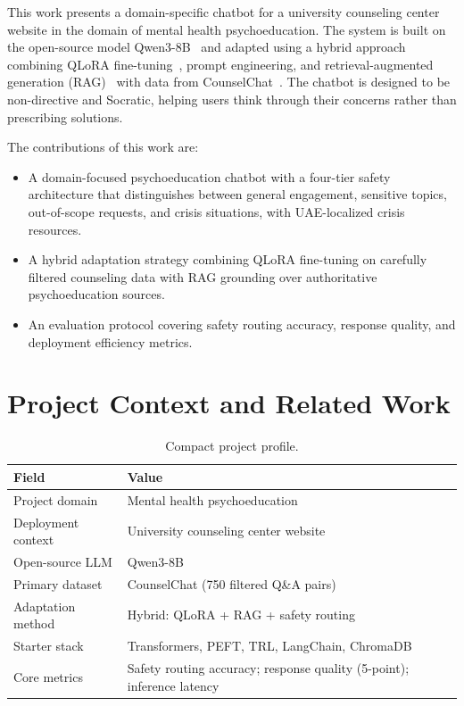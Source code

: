 \documentclass[conference]{IEEEtran}
\begin{document}
This work presents a domain-specific chatbot for a university counseling center website in the domain of mental health psychoeducation. The system is built on the open-source model Qwen3-8B~\cite{qwen3} and adapted using a hybrid approach combining QLoRA fine-tuning~\cite{dettmers2023qlora}, prompt engineering, and retrieval-augmented generation (RAG)~\cite{lewis2020rag} with data from CounselChat~\cite{counselchat}. The chatbot is designed to be non-directive and Socratic, helping users think through their concerns rather than prescribing solutions.

The contributions of this work are:
\begin{itemize}
\item A domain-focused psychoeducation chatbot with a four-tier safety architecture that distinguishes between general engagement, sensitive topics, out-of-scope requests, and crisis situations, with UAE-localized crisis resources.
\item A hybrid adaptation strategy combining QLoRA fine-tuning on carefully filtered counseling data with RAG grounding over authoritative psychoeducation sources.
\item An evaluation protocol covering safety routing accuracy, response quality, and deployment efficiency metrics.
\end{itemize}

\section{Project Context and Related Work}

\begin{table}[t]
\centering
\caption{Compact project profile.}
\label{tab:profile}
\small
\begin{tabular}{@{}p{2.8cm}p{4.8cm}@{}}
\toprule
\textbf{Field} & \textbf{Value} \\
\midrule
Project domain & Mental health psychoeducation \\
Deployment context & University counseling center website \\
Open-source LLM & Qwen3-8B \\
Primary dataset & CounselChat (750 filtered Q\&A pairs) \\
Adaptation method & Hybrid: QLoRA + RAG + safety routing \\
Starter stack & Transformers, PEFT, TRL, LangChain, ChromaDB \\
Core metrics & Safety routing accuracy; response quality (5-point); inference latency \\
\bottomrule
\end{tabular}
\end{table}
\end{document}
